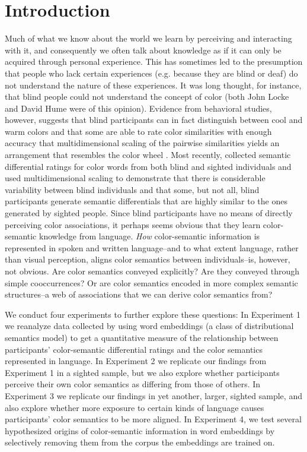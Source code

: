 \documentclass[10pt,letterpaper]{article}
\begin{document}
\section{Introduction}
Much of what we know about the world we learn by perceiving and interacting with it, and consequently we often talk about knowledge as if it can only be acquired through personal experience. This has sometimes led to the presumption that people who lack certain experiences (e.g. because they are blind or deaf) do not understand the nature of these experiences. It was long thought, for instance, that blind people could not understand the concept of color (both John Locke and David Hume were of this opinion). Evidence from behavioral studies, however, suggests that blind participants can in fact distinguish between cool and warm colors \cite{shepard1992representation} and that some are able to rate color similarities with enough accuracy that multidimensional scaling of the pairwise similarities yields an arrangement that resembles the color wheel \cite{marmor1978age,saysani2018colour}. Most recently,  collected semantic differential ratings for color words from both blind and sighted individuals and used multidimensional scaling to demonstrate that there is considerable variability between blind individuals and that some, but not all, blind participants generate semantic differentials that are highly similar to the ones generated by sighted people. Since blind participants have no means of directly perceiving color associations, it perhaps seems obvious that they learn color-semantic knowledge from language. \emph{How} color-semantic information is represented in spoken and written language--and to what extent language, rather than visual perception, aligns color semantics between individuals--is, however, not obvious. Are color semantics conveyed explicitly? Are they conveyed through simple cooccurrences? Or are color semantics encoded in more complex semantic structures--a web of associations that we can derive color semantics from?

We conduct four experiments to further explore these questions: In Experiment 1 we reanalyze data collected by  using word embeddings (a class of distributional semantics model) to get a quantitative measure of the relationship between participants' color-semantic differential ratings and the color semantics represented in language. In Experiment 2 we replicate our findings from Experiment 1 in a sighted sample, but we also explore whether participants perceive their own color semantics as differing from those of others. In Experiment 3 we replicate our findings in yet another, larger, sighted sample, and also explore whether more exposure to certain kinds of language causes participants' color semantics to be more aligned. In Experiment 4, we test several hypothesized origins of color-semantic information in word embeddings by selectively removing them from the corpus the embeddings are trained on.
\end{document}
